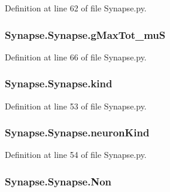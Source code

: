 Definition at line 62 of file Synapse.\-py.

\hypertarget{class_synapse_1_1_synapse_a470750725ecb176e048a973b9dc23ea3}{
\subsubsection[{g\-Max\-Tot\-\_\-mu\-S}]{\setlength{\rightskip}{0pt plus 5cm}Synapse.\-Synapse.\-g\-Max\-Tot\-\_\-mu\-S}}\label{class_synapse_1_1_synapse_a470750725ecb176e048a973b9dc23ea3}


Definition at line 66 of file Synapse.\-py.

\hypertarget{class_synapse_1_1_synapse_aa2ea45450a3ad13cfefcae9fabe6ce15}{
\subsubsection[{kind}]{\setlength{\rightskip}{0pt plus 5cm}Synapse.\-Synapse.\-kind}}\label{class_synapse_1_1_synapse_aa2ea45450a3ad13cfefcae9fabe6ce15}


Definition at line 53 of file Synapse.\-py.

\hypertarget{class_synapse_1_1_synapse_a031af2fe7be76f9b5f69c087228a1b9a}{
\subsubsection[{neuron\-Kind}]{\setlength{\rightskip}{0pt plus 5cm}Synapse.\-Synapse.\-neuron\-Kind}}\label{class_synapse_1_1_synapse_a031af2fe7be76f9b5f69c087228a1b9a}


Definition at line 54 of file Synapse.\-py.

\hypertarget{class_synapse_1_1_synapse_af8779bbc2ee2c5ae7747ee5cfbcf112e}{
\subsubsection[{Non}]{\setlength{\rightskip}{0pt plus 5cm}Synapse.\-Synapse.\-Non}}\label{class_synapse_1_1_synapse_af8779bbc2ee2c5ae7747ee5cfbcf112e}


